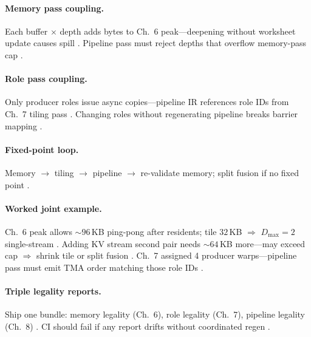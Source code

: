 \paragraph{Memory pass coupling.}
Each buffer $\times$ depth adds bytes to Ch.~6 peak---deepening without worksheet update causes spill \citep{memoryfloor2026,yirage2026}.
Pipeline pass must reject depths that overflow memory-pass cap \citep{wu2024mirage,chen2020compilerbasedhardw}.

\paragraph{Role pass coupling.}
Only producer roles issue async copies---pipeline IR references role IDs from Ch.~7 tiling pass \citep{shah2024flashattention3,yirage2026,mpk2025}.
Changing roles without regenerating pipeline breaks barrier mapping \citep{semianalysis2024tma,patel2025llminference}.

\paragraph{Fixed-point loop.}
Memory $\rightarrow$ tiling $\rightarrow$ pipeline $\rightarrow$ re-validate memory; split fusion if no fixed point \citep{yirage2026,wu2024mirage,mpk2025,dao2022flashattention}.

\paragraph{Worked joint example.}
Ch.~6 peak allows ${\sim}96$\,KB ping-pong after residents; tile $32$\,KB $\Rightarrow$ $D_{\max}{=}2$ single-stream \citep{yirage2026,dao2022flashattention,taxbreak2026}.
Adding KV stream second pair needs ${\sim}64$\,KB more---may exceed cap $\Rightarrow$ shrink tile or split fusion \citep{kwon2023vllm,memoryfloor2026,shah2024flashattention3}.
Ch.~7 assigned 4 producer warps---pipeline pass must emit TMA order matching those role IDs \citep{semianalysis2024tma,yirage2026}.

\paragraph{Triple legality reports.}
Ship one bundle: memory legality (Ch.~6), role legality (Ch.~7), pipeline legality (Ch.~8) \citep{chen2020compilerbasedhardw,yirage2026,wu2024mirage}.
CI should fail if any report drifts without coordinated regen \citep{taxbreak2026,patel2025llminference,mpk2025}.

